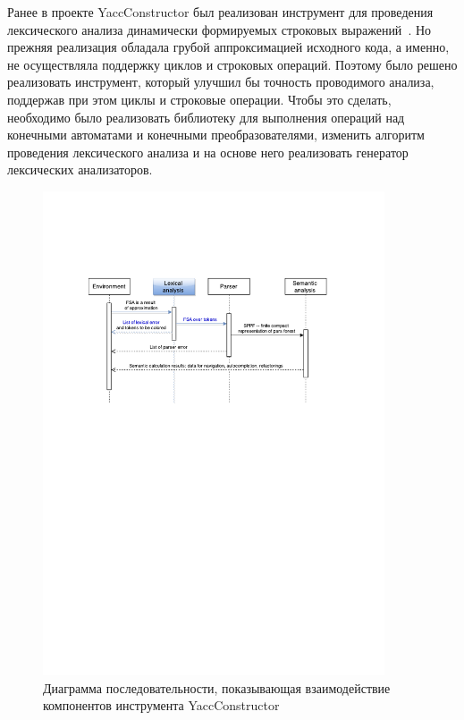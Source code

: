 Ранее в проекте YaccConstructor был реализован инструмент для проведения лексического анализа динамически формируемых строковых выражений~\cite{Verbitskaya, Polubelova}. Но прежняя реализация обладала грубой аппроксимацией исходного кода, а именно, не осуществляла поддержку циклов и строковых операций. Поэтому было решено реализовать инструмент, который улучшил  бы точность проводимого анализа, поддержав при этом циклы и строковые операции. Чтобы это сделать, необходимо было реализовать библиотеку для выполнения операций над конечными автоматами и конечными преобразователями, изменить алгоритм проведения лексического анализа и на основе него реализовать генератор лексических анализаторов. 

\begin{figure}[h!]
\begin{center}
\includegraphics[width=0.9\textwidth]{Polubelova/Seq_with_lexer_highlighted}
\caption{Диаграмма последовательности, показывающая взаимодействие компонентов инструмента YaccConstructor}
\label{fig:seqYC} 
\end{center}
\end{figure}

